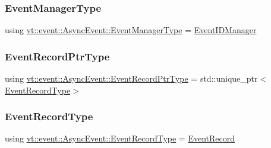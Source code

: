 \mbox{\label{structvt_1_1event_1_1_async_event_a087519ac9e5ceaf317a2f6f583bfabd6}} 
\subsubsection{\texorpdfstring{Event\+Manager\+Type}{EventManagerType}}
{\footnotesize\ttfamily using \hyperlink{structvt_1_1event_1_1_async_event_a087519ac9e5ceaf317a2f6f583bfabd6}{vt\+::event\+::\+Async\+Event\+::\+Event\+Manager\+Type} =  \hyperlink{structvt_1_1event_1_1_event_i_d_manager}{Event\+I\+D\+Manager}}

\mbox{\label{structvt_1_1event_1_1_async_event_a858268f301cb838d33d21cc66232803b}} 
\subsubsection{\texorpdfstring{Event\+Record\+Ptr\+Type}{EventRecordPtrType}}
{\footnotesize\ttfamily using \hyperlink{structvt_1_1event_1_1_async_event_a858268f301cb838d33d21cc66232803b}{vt\+::event\+::\+Async\+Event\+::\+Event\+Record\+Ptr\+Type} =  std\+::unique\+\_\+ptr$<$\hyperlink{structvt_1_1event_1_1_async_event_a5b4ef37db6e5962fdc0e6e0e56e74bc1}{Event\+Record\+Type}$>$}

\mbox{\label{structvt_1_1event_1_1_async_event_a5b4ef37db6e5962fdc0e6e0e56e74bc1}} 
\subsubsection{\texorpdfstring{Event\+Record\+Type}{EventRecordType}}
{\footnotesize\ttfamily using \hyperlink{structvt_1_1event_1_1_async_event_a5b4ef37db6e5962fdc0e6e0e56e74bc1}{vt\+::event\+::\+Async\+Event\+::\+Event\+Record\+Type} =  \hyperlink{structvt_1_1event_1_1_event_record}{Event\+Record}}

